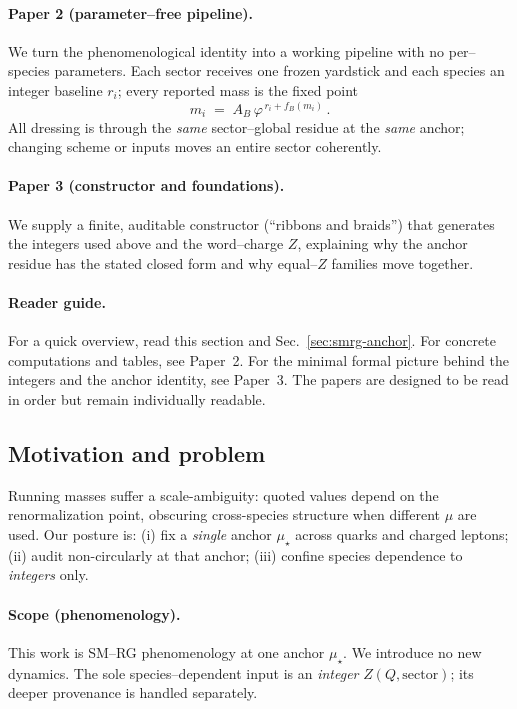 \documentclass[epjc3]{svjour3}
\begin{document}
\paragraph{Paper 2 (parameter--free pipeline).}
We turn the phenomenological identity into a working pipeline with no per--species parameters. Each sector receives one frozen yardstick and each species an integer baseline $r_i$; every reported mass is the fixed point
\[
  m_i \;=\; A_B\,\varphi^{\,r_i + f_B(m_i)}\,.
\]
All dressing is through the \emph{same} sector--global residue at the \emph{same} anchor; changing scheme or inputs moves an entire sector coherently.

\paragraph{Paper 3 (constructor and foundations).}
We supply a finite, auditable constructor (``ribbons and braids'') that generates the integers used above and the word--charge $Z$, explaining why the anchor residue has the stated closed form and why equal--$Z$ families move together.

\paragraph{Reader guide.}
For a quick overview, read this section and Sec.~\ref{sec:smrg-anchor}. For concrete computations and tables, see Paper~2. For the minimal formal picture behind the integers and the anchor identity, see Paper~3. The papers are designed to be read in order but remain individually readable.



\subsection{Motivation and problem}
Running masses suffer a scale-ambiguity: quoted values depend on the renormalization point, obscuring cross-species structure when different $\mu$ are used. Our posture is: (i) fix a \emph{single} anchor $\mu_\star$ across quarks and charged leptons; (ii) audit non-circularly at that anchor; (iii) confine species dependence to \emph{integers} only.

\paragraph{Scope (phenomenology).}
This work is SM–RG phenomenology at one anchor $\mu_\star$. We introduce no new dynamics. The sole species–dependent input is an \emph{integer} $Z(Q,\text{sector})$; its deeper provenance is handled separately.
\end{document}

